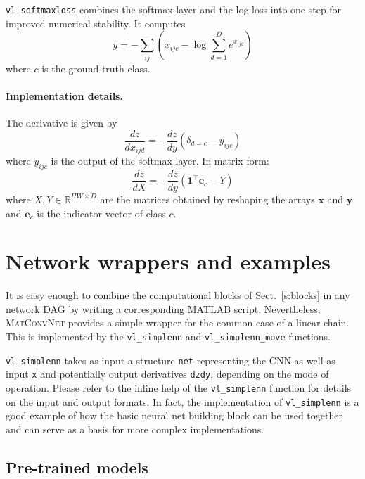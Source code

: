 \documentclass[12pt]{article}
\newcommand{\real}{\mathbb{R}}
\newcommand{\vlnn}{\textsc{MatConvNet}\xspace}
\newcommand{\bx}{\mathbf{x}}
\newcommand{\by}{\mathbf{y}}
\newcommand{\bfe}{\mathbf{e}}
\newcommand{\bone}{\mathbf{1}}
\begin{document}
\verb!vl_softmaxloss! combines the softmax layer and the log-loss into one step for improved numerical stability. It computes
\[
y = - \sum_{ij} \left(
x_{ijc} - \log \sum_{d=1}^D e^{x_{ijd}}
\right)
\]
where $c$ is the ground-truth class.

\paragraph{Implementation details.} The derivative is given by
\[
\frac{dz}{dx_{ijd}} 
= - \frac{dz}{dy} \left(\delta_{d=c} - y_{ijc}\right)
\]
where $y_{ijc}$ is the output of the softmax layer. In matrix form:
\[
\frac{dz}{dX} 
= - \frac{dz}{dy} \left(\bone^\top \bfe_c - Y\right)
\]
where $X,Y\in\real^{HW\times D}$ are the matrices obtained by reshaping the arrays
$\bx$ and $\by$ and $\bfe_c$ is the indicator vector of class $c$.

\section{Network wrappers and examples}\label{s:wrappers}

It is easy enough to combine the computational blocks of Sect.~\ref{s:blocks} in any network DAG by writing a corresponding MATLAB script. Nevertheless, \vlnn provides a simple wrapper for the common case of a linear chain. This is implemented by the \verb!vl_simplenn! and \verb!vl_simplenn_move! functions.

\verb!vl_simplenn! takes as input a structure \verb!net! representing the CNN as well as input \verb!x! and potentially output derivatives \verb!dzdy!, depending on the mode of operation. Please refer to the inline help of the \verb!vl_simplenn! function for details on the input and output formats. In fact, the implementation of \verb!vl_simplenn! is a good example of how the basic neural net building block can be used together and can serve as a basis for more complex implementations.

\subsection{Pre-trained models}
\end{document}
